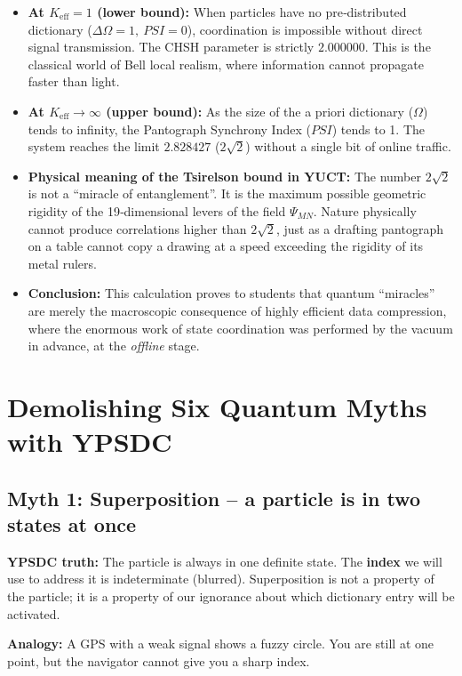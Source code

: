 \documentclass[12pt,a4paper]{article}
\begin{document}
	\begin{itemize}
		\item \textbf{At \(K_{\mathrm{eff}} = 1\) (lower bound):}  
		When particles have no pre‑distributed dictionary (\(\Delta\Omega = 1,\ PSI = 0\)), coordination is impossible without direct signal transmission. The CHSH parameter is strictly \(2.000000\). This is the classical world of Bell local realism, where information cannot propagate faster than light.
		
		\item \textbf{At \(K_{\mathrm{eff}} \to \infty\) (upper bound):}  
		As the size of the a priori dictionary (\(\Omega\)) tends to infinity, the Pantograph Synchrony Index (\(PSI\)) tends to 1. The system reaches the limit \(2.828427\) (\(2\sqrt{2}\)) without a single bit of online traffic.
		
		\item \textbf{Physical meaning of the Tsirelson bound in YUCT:}  
		The number \(2\sqrt{2}\) is not a ``miracle of entanglement''. It is the maximum possible geometric rigidity of the 19‑dimensional levers of the field \(\Psi_{MN}\). Nature physically cannot produce correlations higher than \(2\sqrt{2}\), just as a drafting pantograph on a table cannot copy a drawing at a speed exceeding the rigidity of its metal rulers.
		
		\item \textbf{Conclusion:}  
		This calculation proves to students that quantum ``miracles'' are merely the macroscopic consequence of highly efficient data compression, where the enormous work of state coordination was performed by the vacuum in advance, at the \textit{offline} stage.
	\end{itemize}
	
	
	\section{Demolishing Six Quantum Myths with YPSDC}
	
	\subsection{Myth 1: Superposition -- a particle is in two states at once}
	\textbf{YPSDC truth:} The particle is always in one definite state. The \textbf{index} we will use to address it is indeterminate (blurred). Superposition is not a property of the particle; it is a property of our ignorance about which dictionary entry will be activated.
	\par
	\textbf{Analogy:} A GPS with a weak signal shows a fuzzy circle. You are still at one point, but the navigator cannot give you a sharp index.
	
\end{document}
